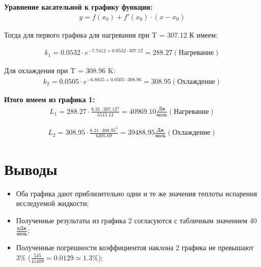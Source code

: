 \documentclass[a4paper, 12pt]{article}
\begin{document}
\noindent\textbf{Уравнение касательной к графику функции:}
	\begin{equation}
		\begin{aligned}
			 y = f(x_0) + f'(x_0) \cdot (x - x_0)
		\end{aligned}
	\end{equation}
 
\noindent Тогда для первого графика для нагревания при T = 307.12 К имеем:

\begin{equation}
	\begin{aligned}
		k_1 = 0.0532 \cdot e^{-7.7412  + 0.0532 \cdot 307.12} = 288.27 (\text{Нагревание})
	\end{aligned}
\end{equation}

\noindent Для охлаждения при T = 308.96 K:
\begin{equation}
	\begin{aligned}
		k_2 = 0.0505 \cdot e^{-6.8835 + 0.0505 \cdot 308.96} = 308.95 (\text{Охлаждение})
	\end{aligned}
\end{equation}

\noindent \textbf{Итого имеем из графика 1:	}
\begin{equation}
	\begin{aligned}
		L_1 = 288.27 \cdot \frac{8.31 \cdot 307.12^2}{5515.13} = 40969.10 \frac{ \text{Дж}}{ \text{моль}} (\text{Нагревание})
	\end{aligned} 
\end{equation}

\begin{equation}
	\begin{aligned}
		L_2 = 308.95 \cdot \frac{8.31 \cdot 308.95^5}{6205.69} = 39488.95 \frac{ \text{Дж}}{\text{моль}} (\text{Охлаждение})
	\end{aligned} 
\end{equation}
	
	
	
	\section{Выводы}
	\begin{itemize}
		\item Оба графика дают приблизительно одни и те же значения теплоты испарения исследуемой жидкости;
		\item Полученные результаты из графика 2 согласуются с табличным значением 40 $\frac{\textbf{кДж}}{\text{моль}}$;
		\item Полученные погрешности коэффициентов наклона 2 графика не превышают 3\% ($\frac{535}{41409} = 0.0129 \simeq 1.3 \%$);
	\end{itemize}
	
\end{document}
